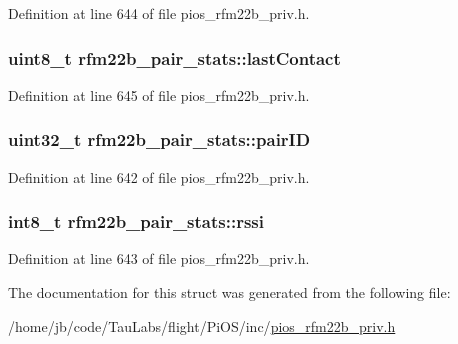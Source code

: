 \-Definition at line 644 of file pios\-\_\-rfm22b\-\_\-priv.\-h.

\hypertarget{structrfm22b__pair__stats_a54401550bc26e4923636667ba5df8d34}{
\subsubsection[{last\-Contact}]{\setlength{\rightskip}{0pt plus 5cm}uint8\-\_\-t {\bf rfm22b\-\_\-pair\-\_\-stats\-::last\-Contact}}}\label{structrfm22b__pair__stats_a54401550bc26e4923636667ba5df8d34}


\-Definition at line 645 of file pios\-\_\-rfm22b\-\_\-priv.\-h.

\hypertarget{structrfm22b__pair__stats_aecbce2c6a0ece945bc66e3fc007a25e2}{
\subsubsection[{pair\-I\-D}]{\setlength{\rightskip}{0pt plus 5cm}uint32\-\_\-t {\bf rfm22b\-\_\-pair\-\_\-stats\-::pair\-I\-D}}}\label{structrfm22b__pair__stats_aecbce2c6a0ece945bc66e3fc007a25e2}


\-Definition at line 642 of file pios\-\_\-rfm22b\-\_\-priv.\-h.

\hypertarget{structrfm22b__pair__stats_a44c32f693c666d5f5e1d0bef314f47d7}{
\subsubsection[{rssi}]{\setlength{\rightskip}{0pt plus 5cm}int8\-\_\-t {\bf rfm22b\-\_\-pair\-\_\-stats\-::rssi}}}\label{structrfm22b__pair__stats_a44c32f693c666d5f5e1d0bef314f47d7}


\-Definition at line 643 of file pios\-\_\-rfm22b\-\_\-priv.\-h.



\-The documentation for this struct was generated from the following file\-:\begin{DoxyCompactItemize}
\item 
/home/jb/code/\-Tau\-Labs/flight/\-Pi\-O\-S/inc/\hyperlink{pios__rfm22b__priv_8h}{pios\-\_\-rfm22b\-\_\-priv.\-h}\end{DoxyCompactItemize}
